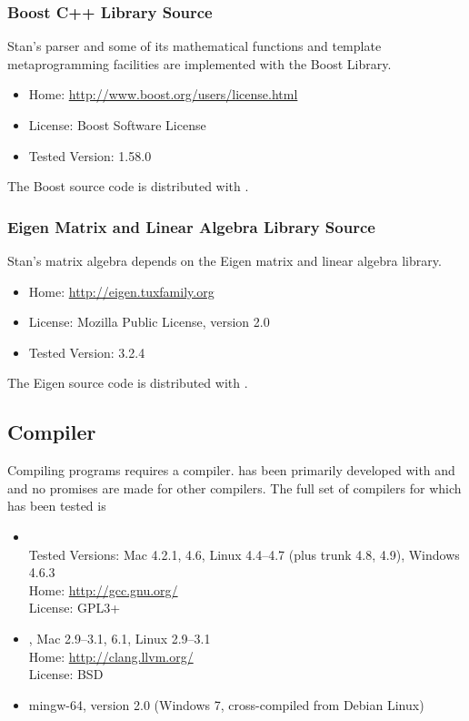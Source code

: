 \subsubsection{Boost C++ Library Source}

Stan's parser and some of its mathematical functions and template
metaprogramming facilities are implemented with the Boost \Cpp
Library.
%
\begin{itemize}
\item Home: \url{http://www.boost.org/users/license.html}
\item License: Boost Software License
\item Tested Version: 1.58.0
\end{itemize}
%
The Boost source code is distributed with \CmdStan.


\subsubsection{Eigen Matrix and Linear Algebra Library Source}

Stan's matrix algebra depends on the Eigen \Cpp matrix and linear
algebra library.
%
\begin{itemize}
\item Home: \url{http://eigen.tuxfamily.org}
\item License: Mozilla Public License, version 2.0
\item Tested Version: 3.2.4
\end{itemize}
%
The Eigen source code is distributed with \CmdStan.


\subsection{\Cpp Compiler}

Compiling \CmdStan programs requires a \Cpp compiler.  \CmdStan has been
primarily developed with \clang and \gpp and no promises are made for
other compilers.  The full set of compilers for which \CmdStan has been
tested is
%
\begin{itemize}
%
\item \gpp
\\
Tested Versions: Mac 4.2.1, 4.6, Linux 4.4--4.7 (plus trunk 4.8, 4.9), Windows 4.6.3
\\
Home: \url{http://gcc.gnu.org/}
\\
License: GPL3+
%
\item \clang, Mac 2.9--3.1, 6.1, Linux 2.9--3.1
\\
Home: \url{http://clang.llvm.org/}
\\
License: BSD
%
\item mingw-64, version 2.0 (Windows 7, cross-compiled from Debian Linux)
%
\end{itemize}
%


